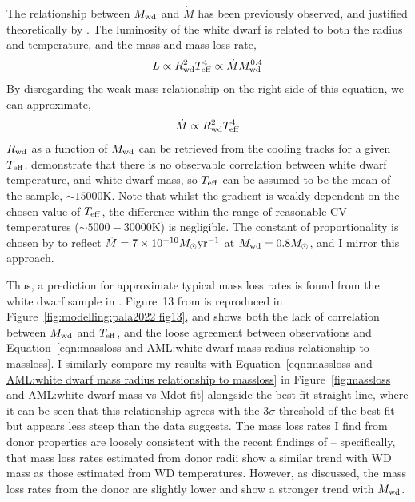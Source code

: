 The relationship between $M_{\rm wd}$ and $\dot M$ has been previously observed, and justified theoretically by \citep{Pala2021}.
The luminosity of the white dwarf is related to both the radius and temperature, and the mass and mass loss rate,
\begin{equation}
    L \propto R^2_{\rm wd} T_{\rm eff}^4 \propto \dot M M_{\rm wd}^{0.4}
\end{equation}
By disregarding the weak mass relationship on the right side of this equation, we can approximate,
\begin{equation}
    \label{eqn:massloss and AML:white dwarf mass radius relationship to massloss}
    \dot M \propto R_{\rm wd}^2 T_{\rm eff}^4
\end{equation}
$R_{\rm wd}$ as a function of $M_{\rm wd}$ can be retrieved from the \citep{Bergeron1995} cooling tracks for a given $T_{\rm eff}$.
\citet{Pala2021} demonstrate that there is no observable correlation between white dwarf temperature, and white dwarf mass, so $T_{\rm eff}$ can be assumed to be the mean of the \citet{Pala2021} sample, $\sim 15000$K.
Note that whilst the gradient is weakly dependent on the chosen value of $T_{\rm eff}$, the difference within the range of reasonable CV temperatures ($\sim 5000 - 30000$K) is negligible.
The constant of proportionality is chosen by \citep{Pala2021} to reflect $\dot M = 7\times 10^{-10} M_\odot {\rm yr^{-1}}$ at $M_{\rm wd} = 0.8 M_\odot$, and I mirror this approach.

Thus, a prediction for approximate typical mass loss rates is found from the white dwarf sample in \citet{Pala2021}. Figure~13 from \citep{Pala2021} is reproduced in Figure~\ref{fig:modelling:pala2022 fig13}, and shows both the lack of correlation between $M_{\rm wd}$ and $T_{\rm eff}$, and the loose agreement between observations and Equation~\ref{eqn:massloss and AML:white dwarf mass radius relationship to massloss}.
I similarly compare my results with Equation~\ref{eqn:massloss and AML:white dwarf mass radius relationship to massloss} in Figure~\ref{fig:massloss and AML:white dwarf mass vs Mdot fit} alongside the best fit straight line, where it can be seen that this relationship agrees with the $3\sigma$ threshold of the best fit but appears less steep than the data suggests.
The mass loss rates I find from donor properties are loosely consistent with the recent findings of \citet{Pala2021} -- specifically, that mass loss rates estimated from donor radii show a similar trend with WD mass as those estimated from WD temperatures. However, as discussed, the mass loss rates from the donor are slightly lower and show a stronger trend with $M_{\rm wd}$.

